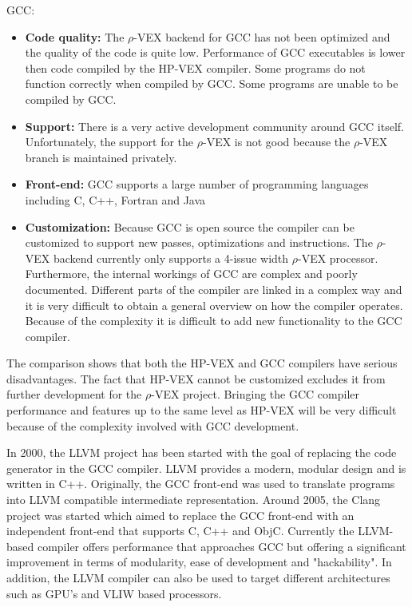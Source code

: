 GCC:
\begin{itemize}
	\item \textbf{Code quality:} The $\rho$-VEX backend for GCC has not been optimized and the quality of the code is quite low. Performance of GCC executables is lower then code compiled by the HP-VEX compiler. Some programs do not function correctly when compiled by GCC. Some programs are unable to be compiled by GCC.
	\item \textbf{Support:} There is a very active development community around GCC itself. Unfortunately, the support for the $\rho$-VEX is not good because the $\rho$-VEX branch is maintained privately.
	\item \textbf{Front-end:} GCC supports a large number of programming languages including C, C++, Fortran and Java
	\item \textbf{Customization:} Because GCC is open source the compiler can be customized to support new passes, optimizations and instructions. The $\rho$-VEX backend currently only supports a 4-issue width $\rho$-VEX processor. Furthermore, the internal workings of GCC are complex and poorly documented. Different parts of the compiler are linked in a complex way and it is very difficult to obtain a general overview on how the compiler operates. Because of the complexity it is difficult to add new functionality to the GCC compiler.
\end{itemize}

The comparison shows that both the HP-VEX and GCC compilers have serious disadvantages. The fact that HP-VEX cannot be customized excludes it from further development for the $\rho$-VEX project. Bringing the GCC compiler performance and features up to the same level as HP-VEX will be very difficult because of the complexity involved with GCC development.  

In 2000, the LLVM project \cite{Chris-Lattner:2004lq} has been started with the goal of replacing the code generator in the GCC compiler. LLVM provides a modern, modular design and is written in C++. Originally, the GCC front-end was used to translate programs into LLVM compatible intermediate representation. Around 2005, the Clang project was started which aimed to replace the GCC front-end with an independent front-end that supports C, C++ and ObjC. Currently the LLVM-based compiler offers performance that approaches GCC but offering a significant improvement in terms of modularity, ease of development and "hackability". In addition, the LLVM compiler can also be used to target different architectures such as GPU's and VLIW based processors.

